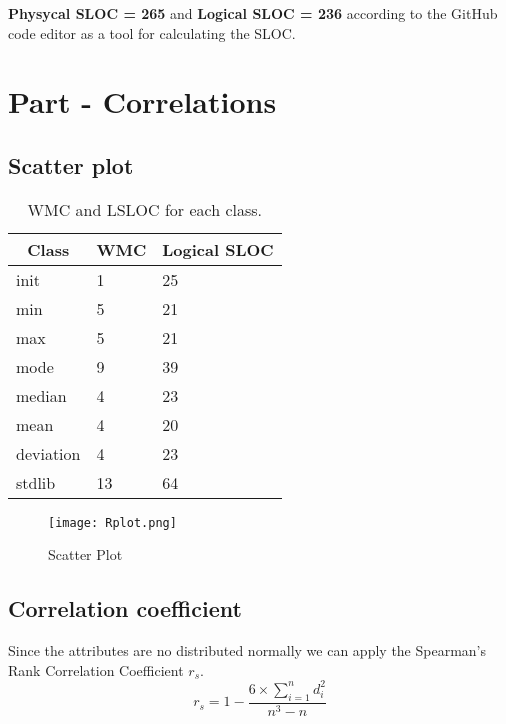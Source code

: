 \documentclass[12pt]{article}
\begin{document}
\textbf{Physycal SLOC = 265} and \textbf{Logical SLOC = 236} according to the GitHub code editor as a tool for calculating the SLOC.
\section{Part - Correlations}
\subsection{Scatter plot}
\begin{table}[h]
\centering
\begin{tabular}{|l|l|l|}
\hline
\multicolumn{1}{|c|}{\textbf{Class}} & \multicolumn{1}{c|}{\textbf{WMC}} & \textbf{Logical SLOC} \\ \hline
init & 1 & 25 \\ \hline
min & 5 & 21 \\ \hline
max & 5 & 21 \\ \hline
mode & 9 & 39 \\ \hline
median & 4 & 23 \\ \hline
mean & 4 & 20 \\ \hline
deviation & 4 & 23 \\ \hline
stdlib & 13 & 64 \\ \hline
\end{tabular}
\caption{WMC and LSLOC for each class.}
\end{table}

\begin{figure}[h]
\centering
\texttt{[image: Rplot.png]}
\caption{Scatter Plot}
\end{figure}

\subsection{Correlation coefficient}
Since the attributes are no distributed normally we can apply the Spearman's Rank Correlation Coefficient $r_{s}$.\cite{Correlation}
\begin{equation}
    r_{s} = 1-\frac{6\times\sum^{n}_{i=1}{d_{i}^2}}{n^3-n}  
\end{equation}
\end{document}
